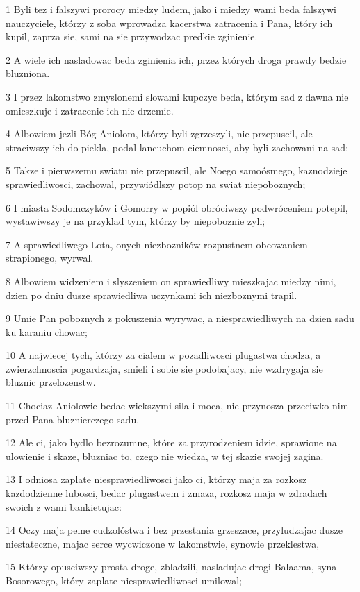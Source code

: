 \par 1 Byli tez i falszywi prorocy miedzy ludem, jako i miedzy wami beda falszywi nauczyciele, którzy z soba wprowadza kacerstwa zatracenia i Pana, który ich kupil, zaprza sie, sami na sie przywodzac predkie zginienie.
\par 2 A wiele ich nasladowac beda zginienia ich, przez których droga prawdy bedzie bluzniona.
\par 3 I przez lakomstwo zmyslonemi slowami kupczyc beda, którym sad z dawna nie omieszkuje i zatracenie ich nie drzemie.
\par 4 Albowiem jezli Bóg Aniolom, którzy byli zgrzeszyli, nie przepuscil, ale straciwszy ich do piekla, podal lancuchom ciemnosci, aby byli zachowani na sad:
\par 5 Takze i pierwszemu swiatu nie przepuscil, ale Noego samoósmego, kaznodzieje sprawiedliwosci, zachowal, przywiódlszy potop na swiat niepoboznych;
\par 6 I miasta Sodomczyków i Gomorry w popiól obróciwszy podwróceniem potepil, wystawiwszy je na przyklad tym, którzy by niepoboznie zyli;
\par 7 A sprawiedliwego Lota, onych niezbozników rozpustnem obcowaniem strapionego, wyrwal.
\par 8 Albowiem widzeniem i slyszeniem on sprawiedliwy mieszkajac miedzy nimi, dzien po dniu dusze sprawiedliwa uczynkami ich niezboznymi trapil.
\par 9 Umie Pan poboznych z pokuszenia wyrywac, a niesprawiedliwych na dzien sadu ku karaniu chowac;
\par 10 A najwiecej tych, którzy za cialem w pozadliwosci plugastwa chodza, a zwierzchnoscia pogardzaja, smieli i sobie sie podobajacy, nie wzdrygaja sie bluznic przelozenstw.
\par 11 Chociaz Aniolowie bedac wiekszymi sila i moca, nie przynosza przeciwko nim przed Pana bluznierczego sadu.
\par 12 Ale ci, jako bydlo bezrozumne, które za przyrodzeniem idzie, sprawione na ulowienie i skaze, bluzniac to, czego nie wiedza, w tej skazie swojej zagina.
\par 13 I odniosa zaplate niesprawiedliwosci jako ci, którzy maja za rozkosz kazdodzienne lubosci, bedac plugastwem i zmaza, rozkosz maja w zdradach swoich z wami bankietujac:
\par 14 Oczy maja pelne cudzolóstwa i bez przestania grzeszace, przyludzajac dusze niestateczne, majac serce wycwiczone w lakomstwie, synowie przeklestwa,
\par 15 Którzy opusciwszy prosta droge, zbladzili, nasladujac drogi Balaama, syna Bosorowego, który zaplate niesprawiedliwosci umilowal;
